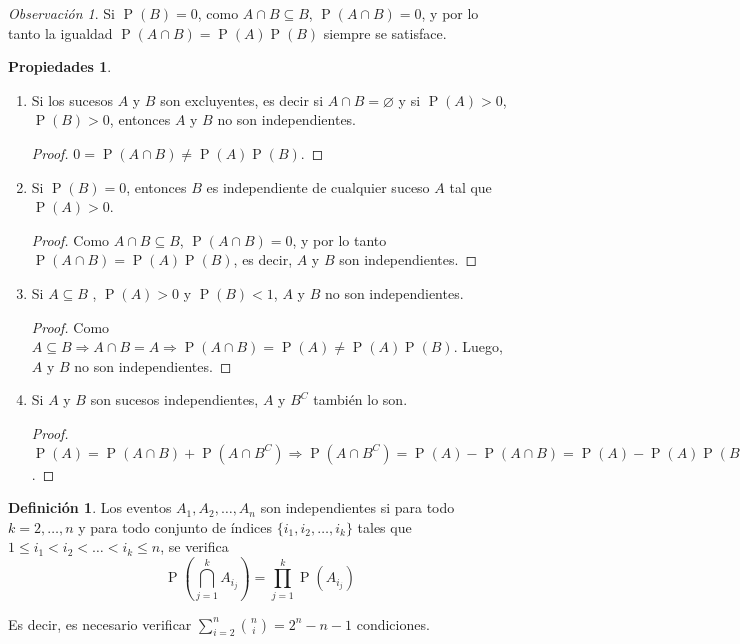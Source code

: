 \documentclass[11pt]{article}
\theoremstyle{plain}
\theoremstyle{definition}
\newtheorem*{defi}{Definición}
\newtheorem*{props}{Propiedades}
\theoremstyle{remark}
\newtheorem*{obs}{Observación}
\newcommand{\proba}{\ensuremath{\operatorname{P}}}  %
\begin{document}
    \begin{obs}
      Si $\proba(B) = 0$, como $A \cap B \subseteq B$, $\proba(A \cap B) = 0$, y por lo tanto la igualdad $\proba(A \cap B) = \proba(A) \proba(B)$ siempre se satisface.
    \end{obs}

    \begin{props} \
      \begin{enumerate}
        \item Si los sucesos $A$ y $B$ son excluyentes, es decir si $A \cap B = \varnothing$ y si $\proba(A) > 0$, $\proba(B) > 0$, entonces $A$ y $B$ no son independientes.
        \begin{proof}
          $0 = \proba(A \cap B) \neq \proba(A) \proba(B)$.
        \end{proof}

        \item Si $\proba(B) = 0$, entonces $B$ es independiente de cualquier suceso $A$ tal que $\proba(A) > 0$.
        \begin{proof}
          Como $A \cap B \subseteq B$, $\proba(A \cap B) = 0$, y por lo tanto $\proba(A \cap B) = \proba(A) \proba(B)$, es decir, $A$ y $B$ son independientes.
        \end{proof}

        \item Si $A \subseteq B$ , $\proba(A) > 0$ y $\proba(B) < 1$, $A$ y $B$ no son independientes.
        \begin{proof}
          Como $A \subseteq B \Rightarrow A \cap B = A \Rightarrow \proba(A \cap B) = \proba(A) \neq \proba(A) \proba(B)$. Luego, $A$ y $B$ no son independientes.
        \end{proof}

        \item Si $A$ y $B$ son sucesos independientes, $A$ y $B^C$ también lo son.
        \begin{proof}
          $\proba(A) = \proba(A \cap B) + \proba(A \cap B^C) \Rightarrow \proba(A \cap B^C) = \proba(A) - \proba(A \cap B) = \proba(A) - \proba(A) \proba(B) = \proba(A) (1 - \proba(B)) = \proba(A) \proba(B^C)$.
        \end{proof}
      \end{enumerate}
    \end{props}

    \begin{defi}
      Los eventos $A_1, A_2, \dots, A_n$ son independientes si para todo $k = 2, \dots, n$ y para todo conjunto de índices $\lbrace i_1, i_2, \dots, i_k \rbrace$ tales que $1 \leq i_1 < i_2 < \dots < i_k \leq n$, se verifica
      \[ \proba(\bigcap_{j=1}^k A_{i_j}) = \prod_{j=1}^k \proba(A_{i_j}) \]

      Es decir, es necesario verificar $\sum_{i=2}^n \binom{n}{i} = 2^n - n - 1$ condiciones.
    \end{defi}
\end{document}
